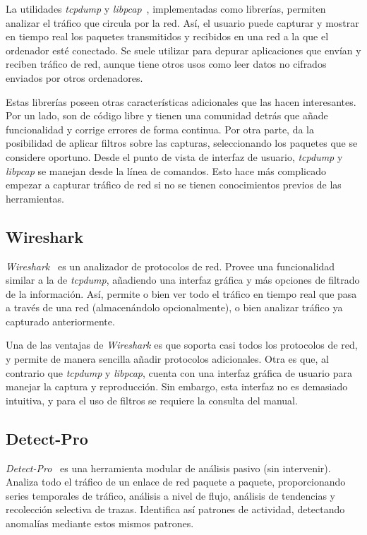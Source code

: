 La utilidades \textit{tcpdump} y \textit{libpcap}~\cite{tcpdump}, implementadas como librerías, permiten analizar el tráfico que circula por la red.
Así, el usuario puede capturar y mostrar en tiempo real los paquetes transmitidos y recibidos en una red a la que el ordenador esté conectado.
Se suele utilizar para depurar aplicaciones que envían y reciben tráfico de red, aunque tiene otros usos como leer datos no cifrados enviados por otros ordenadores.

Estas librerías poseen otras características adicionales que las hacen interesantes.
Por un lado, son de código libre y tienen una comunidad detrás que añade funcionalidad y corrige errores de forma continua.
Por otra parte, da la posibilidad de aplicar filtros sobre las capturas, seleccionando los paquetes que se considere oportuno.
Desde el punto de vista de interfaz de usuario, \textit{tcpdump} y \textit{libpcap} se manejan desde la línea de comandos.
Esto hace más complicado empezar a capturar tráfico de red si no se tienen conocimientos previos de las herramientas.

\subsection*{Wireshark\label{sec:eda:wireshark}}

\textit{Wireshark}~\cite{wireshark} es un analizador de protocolos de red.
Provee una funcionalidad similar a la de \textit{tcpdump}, añadiendo una interfaz gráfica y más opciones de filtrado de la información.
Así, permite o bien ver todo el tráfico en tiempo real que pasa a través de una red (almacenándolo opcionalmente), o bien analizar tráfico ya capturado anteriormente.

Una de las ventajas de \textit{Wireshark} es que soporta casi todos los protocolos de red, y permite de manera sencilla añadir protocolos adicionales.
Otra es que, al contrario que \textit{tcpdump} y \textit{libpcap}, cuenta con una interfaz gráfica de usuario para manejar la captura y reproducción.
Sin embargo, esta interfaz no es demasiado intuitiva, y para el uso de filtros se requiere la consulta del manual.

\subsection*{Detect-Pro\label{sec:eda:detectpro}}

\textit{Detect-Pro}~\cite{detectpro} es una herramienta modular de análisis pasivo (sin intervenir).
Analiza todo el tráfico de un enlace de red paquete a paquete, proporcionando series temporales de tráfico, análisis a nivel de flujo, análisis de tendencias y recolección selectiva de \glspl{traza}.
Identifica así patrones de actividad, detectando anomalías mediante estos mismos patrones.

